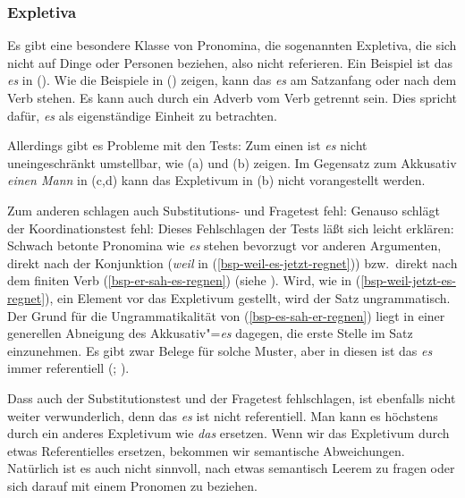 \subsubsection{Expletiva}

Es gibt eine besondere Klasse von Pronomina, die sogenannten Expletiva, die sich nicht
auf Dinge oder Personen beziehen, also nicht referieren. Ein Beispiel ist das \emph{es} in
().
\eal
{}
\zl
Wie die Beispiele in () zeigen, kann das \emph{es} am Satzanfang
oder nach dem Verb stehen. Es kann auch durch ein Adverb vom Verb getrennt sein.
Dies spricht dafür, \emph{es} als eigenständige Einheit zu betrachten.

Allerdings gibt es Probleme mit den Tests: Zum einen ist \emph{es} nicht
uneingeschränkt umstellbar, wie (a) und (b) zeigen.
\eal
{}
\zl
\eal
{}
\zl
Im Gegensatz zum Akkusativ \emph{einen Mann} in (c,d) kann das Expletivum in (b) nicht
vorangestellt werden.

Zum anderen schlagen auch Substitutions- und Fragetest fehl:
\eal
{}
\zl
Genauso schlägt der Koordinationstest fehl:
\z
Dieses Fehlschlagen der Tests läßt sich leicht erklären: Schwach betonte
Pronomina wie \emph{es} stehen bevorzugt vor anderen Argumenten, direkt nach
der Konjunktion (\emph{weil} in (\ref{bsp-weil-es-jetzt-regnet})) bzw.\
direkt nach dem finiten Verb (\ref{bsp-er-sah-es-regnen}) (siehe ). Wird, wie
in (\ref{bsp-weil-jetzt-es-regnet}), ein Element vor das Expletivum gestellt,
wird der Satz ungrammatisch. Der Grund für die Ungrammatikalität von
(\ref{bsp-es-sah-er-regnen}) liegt in einer generellen Abneigung des 
Akkusativ"=\emph{es} dagegen, die erste Stelle im Satz einzunehmen. Es gibt zwar Belege für
solche Muster, aber in diesen ist das \emph{es} immer referentiell (\citealt[\page162]{Lenerz94a};
\citealp[\page4]{GS97a}).

%
Dass auch der Substitutionstest und der Fragetest fehlschlagen, ist ebenfalls
nicht weiter verwunderlich, denn das \emph{es} ist nicht referentiell.
Man kann es höchstens durch ein anderes Expletivum wie \emph{das} ersetzen.
Wenn wir das Expletivum durch etwas Referentielles ersetzen, bekommen wir semantische Abweichungen.
Natürlich ist es auch nicht sinnvoll, nach etwas semantisch Leerem zu fragen oder
sich darauf mit einem Pronomen zu beziehen.


